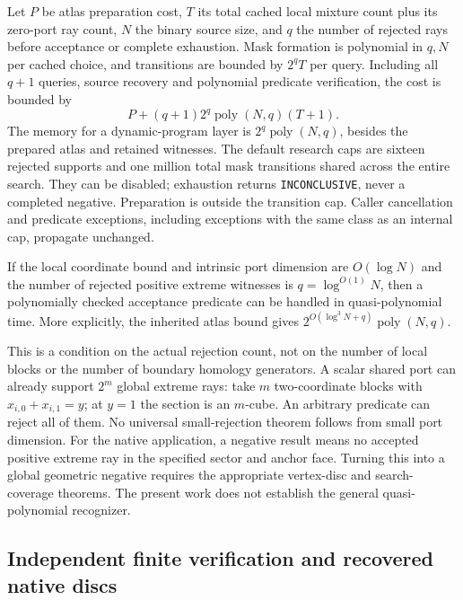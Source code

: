 Let $P$ be atlas preparation cost, $T$ its total cached local mixture
count plus its zero-port ray count, $N$ the binary source size, and $q$ the number of rejected rays
before acceptance or complete exhaustion.  Mask formation is polynomial
in $q,N$ per cached choice, and transitions are bounded by $2^q T$
per query.  Including all $q+1$ queries, source recovery and polynomial
predicate verification, the cost is bounded by
\[
 P+(q+1)2^q\operatorname{poly}(N,q)(T+1).
\]
The memory for a dynamic-program layer is $2^q\operatorname{poly}(N,q)$,
besides the prepared atlas and retained witnesses.  The default research
caps are sixteen rejected supports and one million total mask
transitions shared across the entire search.  They can be disabled;
exhaustion returns \texttt{INCONCLUSIVE}, never a completed negative.
Preparation is outside the transition cap.  Caller cancellation and
predicate exceptions, including exceptions with the same class as an
internal cap, propagate unchanged.

\begin{corollary}
If the local coordinate bound and intrinsic port dimension are
$O(\log N)$ and the number of rejected positive extreme witnesses is
$q=\log^{O(1)}N$, then a polynomially checked acceptance predicate can
be handled in quasi-polynomial time.  More explicitly, the inherited
atlas bound gives $2^{O(\log^3N+q)}\operatorname{poly}(N,q)$.
\end{corollary}

This is a condition on the actual rejection count, not on the number
of local blocks or the number of boundary homology generators.  A
scalar shared port can already support $2^m$ global extreme rays:
take $m$ two-coordinate blocks with $x_{i,0}+x_{i,1}=y$; at $y=1$
the section is an $m$-cube.  An arbitrary predicate can reject all of
them.  No universal small-rejection theorem follows from small port
dimension.  For the native application, a negative result means no
accepted positive extreme ray in the specified sector and anchor
face.  Turning this into a global geometric negative requires the
appropriate vertex-disc and search-coverage theorems.  The present
work does not establish the general quasi-polynomial recognizer.

\subsection{Independent finite verification and recovered native discs}

